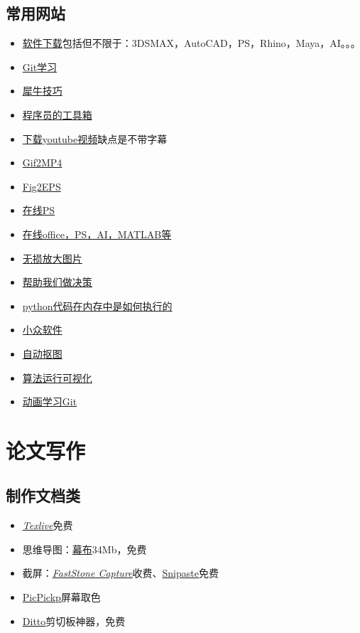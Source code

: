 \documentclass[UTF8,oneside]{ctexbook}
\begin{document}
\subsection{常用网站}
\begin{itemize}
	\item \href{https://www.3d66.com/popsoft_26.html}{软件下载}包括但不限于：3DSMAX，AutoCAD，PS，Rhino，Maya，AI。。。
	\item \href{http://gitbook.liuhui998.com/index.html}{Git学习}
	\item \href{http://www.xuexiniu.com/forum.php?mod=forumdisplay&fid=102&filter=typeid&typeid=1}{犀牛技巧}
	\item \href{https://tool.lu}{程序员的工具箱}
	\item \href{http://www.ytube.win}{下载youtube视频}缺点是不带字幕
	\item \href{https://cloudconvert.com/gif-to-mp4}{Gif2MP4}
	\item \href{https://cn.office-converter.com/FIG-to-EPS}{Fig2EPS}
	\item \href{https://www.photopea.com}{在线PS}
	\item \href{https://uzer.me/u/signin}{在线office，PS，AI，MATLAB等}
	\item \href{https://bigjpg.com}{无损放大图片}
	\item \href{https://www.slant.co}{帮助我们做决策}
	\item \href{http://www.pythontutor.com}{python代码在内存中是如何执行的}
	\item \href{https://www.appinn.com/category/windows/}{小众软件}
	\item \href{https://www.remove.bg}{自动抠图}
	\item \href{https://algorithm-visualizer.org}{算法运行可视化}
	\item \href{https://learngitbranching.js.org/?demo}{动画学习Git}
\end{itemize}

\section{论文写作}
\subsection{制作文档类}
\begin{itemize}
	\item \underline{\textit{\href{https://mirrors.tuna.tsinghua.edu.cn/CTAN/systems/texlive/Images/}{Texlive}}}\quad 免费
	\item 思维导图：\href{https://mubu.com}{幕布}\quad 34Mb，免费
	\item 截屏：\underline{\textit{\href{http://www.faststone.org/FSCaptureDetail.htm}{FastStone Capture}}}\quad 收费、\href{https://www.snipaste.com}{Snipaste}\quad 免费
	\item \href{https://picpick.app/zh/}{PicPickp}\quad 屏幕取色
	\item \href{https://ditto-cp.sourceforge.io}{Ditto}\quad 剪切板神器，免费
\end{itemize}
\end{document}
